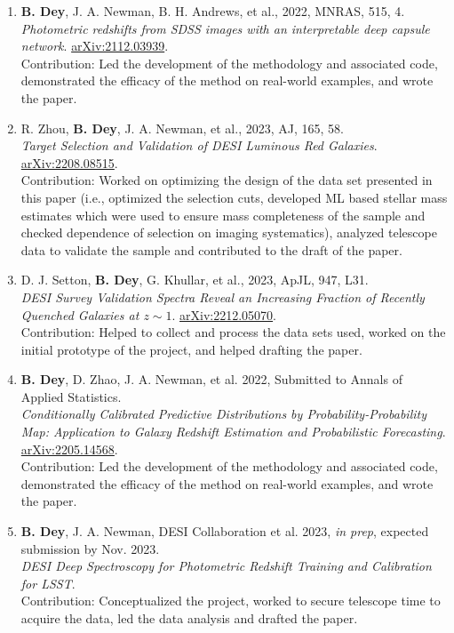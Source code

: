 \begin{enumerate}
         
        \item \textbf{B. Dey}, J. A. Newman, B. H. Andrews, et al., 2022, MNRAS, 515, 4.\\ \textrm{\textit{Photometric redshifts from SDSS images with an interpretable deep capsule network}}. \href{https://arxiv.org/abs/2112.03939}{arXiv:2112.03939}.
         \\ Contribution: Led the development of the methodology and associated code, demonstrated the efficacy of the method on real-world examples, and wrote the paper.
         
         
        \item R. Zhou, \textbf{B. Dey}, J. A. Newman, et al., 2023, AJ, 165, 58.\\ \textrm{\textit{Target Selection and Validation of DESI Luminous Red Galaxies}}. \href{https://arxiv.org/abs/2208.08515}{arXiv:2208.08515}.
         \\ Contribution: Worked on optimizing the design of the data set presented in this paper (i.e., optimized the selection cuts, developed ML based stellar mass estimates which were used to ensure mass completeness of the sample and checked dependence of selection on imaging systematics), analyzed telescope data to validate the sample and contributed to the draft of the paper.

         
        \item D. J. Setton, \textbf{B. Dey}, G. Khullar, et al., 2023, ApJL, 947, L31.\\ \textrm{\textit{DESI Survey Validation Spectra Reveal an Increasing Fraction of Recently Quenched Galaxies at $z\sim 1$}}. \href{https://arxiv.org/abs/2212.05070}{arXiv:2212.05070}.
         \\ Contribution: Helped to collect and process the data sets used, worked on the initial prototype of the project, and helped drafting the paper. 
         

         \item \textbf{B. Dey}, D. Zhao, J. A. Newman, et al. 2022, Submitted to Annals of Applied Statistics.\\
    \textrm{\textit{Conditionally Calibrated Predictive Distributions by Probability-Probability Map: Application to Galaxy Redshift Estimation and Probabilistic Forecasting}}.  \href{https://arxiv.org/abs/2205.14568}{arXiv:2205.14568}.
     \\Contribution: Led the development of the methodology and associated code, demonstrated the efficacy of the method on real-world examples, and wrote the paper.

     
       \item \textbf{B. Dey}, J. A. Newman, DESI Collaboration et al. 2023, \textit{in prep}, expected submission by Nov. 2023.\\
    \textrm{\textit{DESI Deep Spectroscopy for Photometric Redshift Training and Calibration for LSST}}. %
 \\ Contribution: Conceptualized the project, worked to secure telescope time to acquire the data, led the data analysis and drafted the paper. 
    
   
\end{enumerate}
 


% 